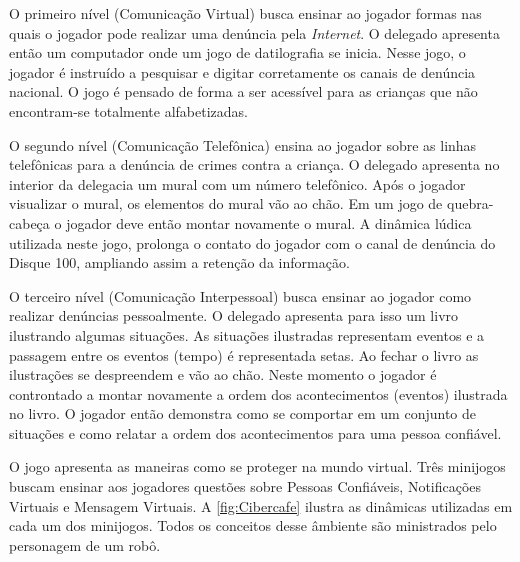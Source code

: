 O primeiro nível (Comunicação Virtual) busca ensinar ao jogador formas nas quais o jogador pode realizar uma denúncia pela \textit{Internet}. O delegado apresenta então um computador onde um jogo de datilografia se inicia. Nesse jogo, o jogador é instruído a pesquisar e digitar corretamente os canais de denúncia nacional. O jogo é pensado de forma a ser acessível para as crianças que não encontram-se totalmente alfabetizadas. 

O segundo nível (Comunicação Telefônica) ensina ao jogador sobre as linhas telefônicas para a denúncia de crimes contra a criança. O delegado apresenta no interior da delegacia um mural com um número telefônico. Após o jogador visualizar o mural, os elementos do mural vão ao chão. Em um jogo de quebra-cabeça o jogador deve então montar novamente o mural. A dinâmica lúdica utilizada neste jogo, prolonga o contato do jogador com o canal de denúncia do Disque 100, ampliando assim a retenção da informação. 

O terceiro nível (Comunicação Interpessoal) busca ensinar ao jogador como realizar denúncias pessoalmente. O delegado apresenta para isso um livro ilustrando algumas situações. As situações ilustradas representam eventos e a passagem entre os eventos (tempo) é representada setas. Ao fechar o livro as ilustrações se despreendem e vão ao chão. Neste momento o jogador é controntado a montar novamente a ordem dos acontecimentos (eventos) ilustrada no livro. O jogador então demonstra como se comportar em um conjunto de situações e como relatar a ordem dos acontecimentos para uma pessoa confiável. 

O jogo apresenta as maneiras como se proteger na mundo virtual. Três minijogos buscam ensinar aos jogadores questões sobre Pessoas Confiáveis, Notificações Virtuais e Mensagem Virtuais. A \autoref{fig:Cibercafe} ilustra as dinâmicas utilizadas em cada um dos minijogos. Todos os conceitos desse âmbiente são ministrados pelo personagem de um robô. 


